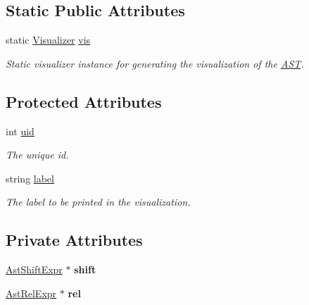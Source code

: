 \subsection*{Static Public Attributes}
\begin{DoxyCompactItemize}
\item 
\hypertarget{classAST_aca9e6637209b31e03a09c0d42f29bdfa}{static \hyperlink{classVisualizer}{Visualizer} \hyperlink{classAST_aca9e6637209b31e03a09c0d42f29bdfa}{vis}}\label{classAST_aca9e6637209b31e03a09c0d42f29bdfa}

\begin{DoxyCompactList}\small\item\em Static visualizer instance for generating the visualization of the \hyperlink{classAST}{A\-S\-T}. \end{DoxyCompactList}\end{DoxyCompactItemize}
\subsection*{Protected Attributes}
\begin{DoxyCompactItemize}
\item 
\hypertarget{classAST_a847b778f1c3dd5a19de32de432ee6e15}{int \hyperlink{classAST_a847b778f1c3dd5a19de32de432ee6e15}{uid}}\label{classAST_a847b778f1c3dd5a19de32de432ee6e15}

\begin{DoxyCompactList}\small\item\em The unique id. \end{DoxyCompactList}\item 
\hypertarget{classAST_ab2e239ccc0688d2341724432ff5a1a31}{string \hyperlink{classAST_ab2e239ccc0688d2341724432ff5a1a31}{label}}\label{classAST_ab2e239ccc0688d2341724432ff5a1a31}

\begin{DoxyCompactList}\small\item\em The label to be printed in the visualization. \end{DoxyCompactList}\end{DoxyCompactItemize}
\subsection*{Private Attributes}
\begin{DoxyCompactItemize}
\item 
\hypertarget{classAstRelExpr_aa22466011d80f82a5e67da7b3bc5e972}{\hyperlink{classAstShiftExpr}{Ast\-Shift\-Expr} $\ast$ {\bfseries shift}}\label{classAstRelExpr_aa22466011d80f82a5e67da7b3bc5e972}

\item 
\hypertarget{classAstRelExpr_abf2a5125056b14661d17be51fbe8b61e}{\hyperlink{classAstRelExpr}{Ast\-Rel\-Expr} $\ast$ {\bfseries rel}}\label{classAstRelExpr_abf2a5125056b14661d17be51fbe8b61e}

\end{DoxyCompactItemize}


